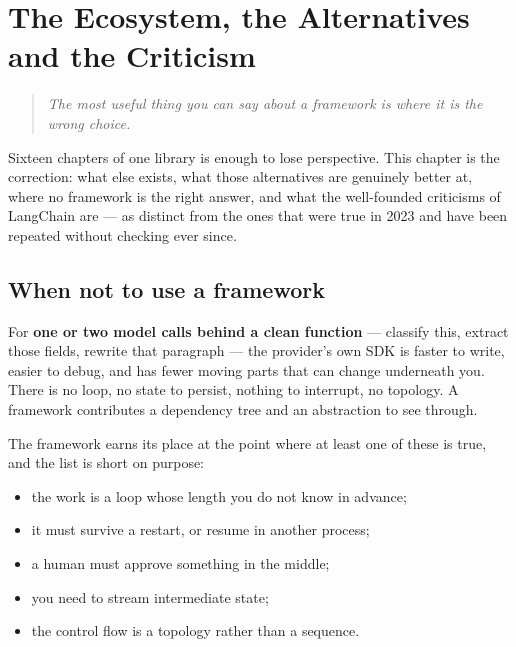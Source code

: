 \chapter{The Ecosystem, the Alternatives and the Criticism}
\label{ch:ecosystem}

\begin{quote}\itshape
The most useful thing you can say about a framework is where it is the wrong
choice.
\end{quote}

\noindent
Sixteen chapters of one library is enough to lose perspective. This chapter is
the correction: what else exists, what those alternatives are genuinely better
at, where no framework is the right answer, and what the well-founded criticisms
of LangChain are --- as distinct from the ones that were true in 2023 and have
been repeated without checking ever since.

\section{When not to use a framework}
\label{sec:no-framework}


For \textbf{one or two model calls behind a clean function} --- classify this,
extract those fields, rewrite that paragraph --- the provider's own SDK is faster
to write, easier to debug, and has fewer moving parts that can change underneath
you. There is no loop, no state to persist, nothing to interrupt, no topology. A
framework contributes a dependency tree and an abstraction to see through.

The framework earns its place at the point where at least one of these is true,
and the list is short on purpose:

\begin{itemize}[leftmargin=1.4em,nosep]
\item the work is a loop whose length you do not know in advance;
\item it must survive a restart, or resume in another process;
\item a human must approve something in the middle;
\item you need to stream intermediate state;
\item the control flow is a topology rather than a sequence.
\end{itemize}

